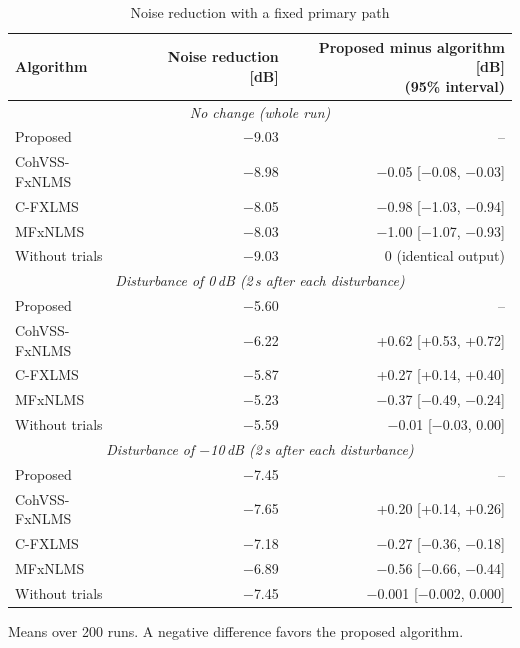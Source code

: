\begin{table}[tbp]
\centering
\footnotesize
\setlength{\tabcolsep}{4pt}
\caption{Noise reduction with a fixed primary path}
\label{tab:atsip-3}
\begin{tabular}{lrr}
\toprule
Algorithm & Noise reduction [dB] & \makecell[r]{Proposed minus algorithm [dB]\\(95\% interval)} \\
\midrule
\multicolumn{3}{c}{\textit{No change (whole run)}} \\
\cmidrule(lr){1-3}
Proposed & $-$9.03 & -- \\
CohVSS-FxNLMS & $-$8.98 & $-$0.05 [$-$0.08, $-$0.03] \\
C-FXLMS & $-$8.05 & $-$0.98 [$-$1.03, $-$0.94] \\
MFxNLMS & $-$8.03 & $-$1.00 [$-$1.07, $-$0.93] \\
Without trials & $-$9.03 & 0 (identical output) \\
\midrule
\multicolumn{3}{c}{\textit{Disturbance of 0\,dB (2\,s after each disturbance)}} \\
\cmidrule(lr){1-3}
Proposed & $-$5.60 & -- \\
CohVSS-FxNLMS & $-$6.22 & +0.62 [+0.53, +0.72] \\
C-FXLMS & $-$5.87 & +0.27 [+0.14, +0.40] \\
MFxNLMS & $-$5.23 & $-$0.37 [$-$0.49, $-$0.24] \\
Without trials & $-$5.59 & $-$0.01 [$-$0.03, 0.00] \\
\midrule
\multicolumn{3}{c}{\textit{Disturbance of $-$10\,dB (2\,s after each disturbance)}} \\
\cmidrule(lr){1-3}
Proposed & $-$7.45 & -- \\
CohVSS-FxNLMS & $-$7.65 & +0.20 [+0.14, +0.26] \\
C-FXLMS & $-$7.18 & $-$0.27 [$-$0.36, $-$0.18] \\
MFxNLMS & $-$6.89 & $-$0.56 [$-$0.66, $-$0.44] \\
Without trials & $-$7.45 & $-$0.001 [$-$0.002, 0.000] \\
\bottomrule
\end{tabular}
\par\medskip
\begin{minipage}{0.98\textwidth}
Means over 200 runs. A negative difference favors the proposed algorithm.\par
\end{minipage}
\par{}
\end{table}
